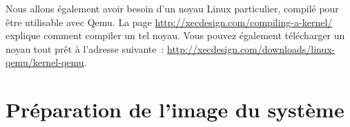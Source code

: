 \documentclass{article}
\begin{document}
Nous allons également avoir besoin d'un noyau Linux particulier, compilé pour être utilisable avec Qemu.
La page \url{http://xecdesign.com/compiling-a-kernel/} explique comment compiler un tel noyau.
Vous pouvez également télécharger un noyau tout prêt à l'adresse suivante~:
\url{http://xecdesign.com/downloads/linux-qemu/kernel-qemu}.



\section{Préparation de l'image du système}\label{sec:setup-image}
\end{document}
